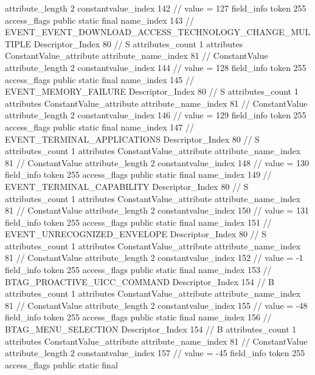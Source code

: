 {{{{{{{					attribute_length	2
					constantvalue_index	142		// value = 127
				}
				}
			}
			field_info {
				token	255
				access_flags	public static final
				name_index	143		// EVENT_EVENT_DOWNLOAD_ACCESS_TECHNOLOGY_CHANGE_MULTIPLE
				Descriptor_Index	80		// S
				attributes_count	1
				attributes {
				ConstantValue_attribute {
					attribute_name_index	81		// ConstantValue
					attribute_length	2
					constantvalue_index	144		// value = 128
				}
				}
			}
			field_info {
				token	255
				access_flags	public static final
				name_index	145		// EVENT_MEMORY_FAILURE
				Descriptor_Index	80		// S
				attributes_count	1
				attributes {
				ConstantValue_attribute {
					attribute_name_index	81		// ConstantValue
					attribute_length	2
					constantvalue_index	146		// value = 129
				}
				}
			}
			field_info {
				token	255
				access_flags	public static final
				name_index	147		// EVENT_TERMINAL_APPLICATIONS
				Descriptor_Index	80		// S
				attributes_count	1
				attributes {
				ConstantValue_attribute {
					attribute_name_index	81		// ConstantValue
					attribute_length	2
					constantvalue_index	148		// value = 130
				}
				}
			}
			field_info {
				token	255
				access_flags	public static final
				name_index	149		// EVENT_TERMINAL_CAPABILITY
				Descriptor_Index	80		// S
				attributes_count	1
				attributes {
				ConstantValue_attribute {
					attribute_name_index	81		// ConstantValue
					attribute_length	2
					constantvalue_index	150		// value = 131
				}
				}
			}
			field_info {
				token	255
				access_flags	public static final
				name_index	151		// EVENT_UNRECOGNIZED_ENVELOPE
				Descriptor_Index	80		// S
				attributes_count	1
				attributes {
				ConstantValue_attribute {
					attribute_name_index	81		// ConstantValue
					attribute_length	2
					constantvalue_index	152		// value = -1
				}
				}
			}
			field_info {
				token	255
				access_flags	public static final
				name_index	153		// BTAG_PROACTIVE_UICC_COMMAND
				Descriptor_Index	154		// B
				attributes_count	1
				attributes {
				ConstantValue_attribute {
					attribute_name_index	81		// ConstantValue
					attribute_length	2
					constantvalue_index	155		// value = -48
				}
				}
			}
			field_info {
				token	255
				access_flags	public static final
				name_index	156		// BTAG_MENU_SELECTION
				Descriptor_Index	154		// B
				attributes_count	1
				attributes {
				ConstantValue_attribute {
					attribute_name_index	81		// ConstantValue
					attribute_length	2
					constantvalue_index	157		// value = -45
				}
				}
			}
			field_info {
				token	255
				access_flags	public static final
}}}}}
